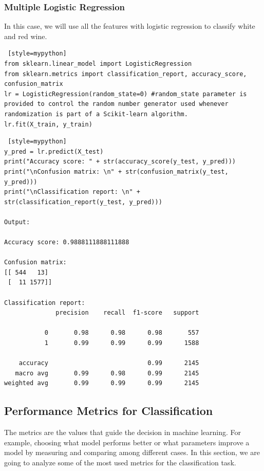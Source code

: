 \subsubsection{Multiple Logistic Regression}
In this case, we will use all the features with logistic regression to classify white and red wine.
\begin{lstlisting} [style=mypython]
from sklearn.linear_model import LogisticRegression
from sklearn.metrics import classification_report, accuracy_score, confusion_matrix
lr = LogisticRegression(random_state=0) #random_state parameter is provided to control the random number generator used whenever randomization is part of a Scikit-learn algorithm.
lr.fit(X_train, y_train)   
\end{lstlisting}

\begin{lstlisting} [style=mypython]
y_pred = lr.predict(X_test)
print("Accuracy score: " + str(accuracy_score(y_test, y_pred)))
print("\nConfusion matrix: \n" + str(confusion_matrix(y_test, y_pred)))
print("\nClassification report: \n" + str(classification_report(y_test, y_pred)))

Output: 

Accuracy score: 0.9888111888111888

Confusion matrix: 
[[ 544   13]
 [  11 1577]]

Classification report: 
              precision    recall  f1-score   support

           0       0.98      0.98      0.98       557
           1       0.99      0.99      0.99      1588

    accuracy                           0.99      2145
   macro avg       0.99      0.98      0.99      2145
weighted avg       0.99      0.99      0.99      2145

\end{lstlisting}





\subsection{Performance Metrics for Classification}
The metrics are the values that guide the decision in machine learning. For example, choosing what model performs better or what parameters improve a model by measuring and comparing among different cases. In this section, we are going to analyze some of the most used metrics for the classification task.

